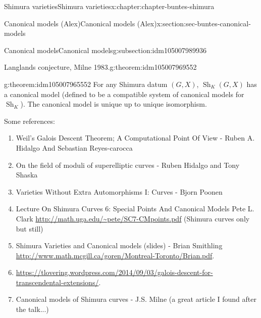 \documentclass[oneside,10pt,]{book}
\numberwithin{equation}{section}
\begin{document}
\begin{chapterptx}{Shimura varieties}{}{Shimura varieties}{}{}{x:chapter:chapter-buntes-shimura}
\begin{sectionptx}{Canonical models (Alex)}{}{Canonical models (Alex)}{}{}{x:section:sec-buntes-canonical-models}
\begin{subsectionptx}{Canonical models}{}{Canonical models}{}{}{g:subsection:idm105007989936}
\begin{theorem}{Langlands conjecture, Milne 1983.}{}{g:theorem:idm105007969552}
\end{theorem}
\begin{theorem}{}{}{g:theorem:idm105007965552}%
For any Shimura datum \((G,X)\), \({\operatorname{Sh}}_K(G,X)\) has a canonical model (defined to be a compatible system of canonical models for \({\operatorname{Sh}}_K\)). The canonical model is unique up to unique isomorphism.%
\end{theorem}
Some references:%
\begin{enumerate}
\item{}Weil’s Galois Descent Theorem; A Computational Point Of View - Ruben A. Hidalgo And Sebastian Reyes-carocca%
\item{}On the field of moduli of superelliptic curves - Ruben Hidalgo and Tony Shaska%
\item{}Varieties Without Extra Automorphisms I: Curves - Bjorn Poonen%
\item{}Lecture On Shimura Curves 6: Special Points And Canonical Models Pete L. Clark \url{http://math.uga.edu/\~pete/SC7-CMpoints.pdf} (Shimura curves only but still)%
\item{}Shimura Varieties and Canonical models (slides) - Brian Smithling \url{http://www.math.mcgill.ca/goren/Montreal-Toronto/Brian.pdf}.%
\item{}\url{https://tlovering.wordpress.com/2014/09/03/galois-descent-for-transcendental-extensions/}.%
\item{}Canonical models of Shimura curves -  J.S. Milne (a great article I found after the talk...)%
\end{enumerate}
%
\end{subsectionptx}
\end{sectionptx}
\end{chapterptx}
%
%
\typeout{************************************************}
\typeout{************************************************}
%
\end{document}
